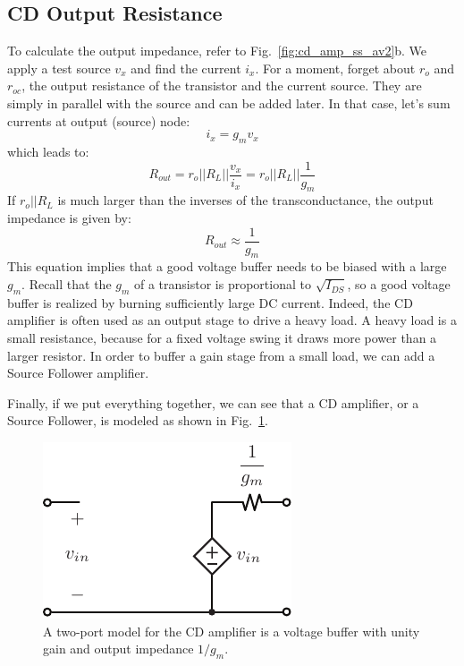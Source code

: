 \subsection{CD Output Resistance}
To calculate the output impedance, refer to Fig.~\ref{fig:cd_amp_ss_av2}b.  We apply a test source $v_x$ and find the current $i_x$.  For a moment, forget about $r_o$ and $r_{oc}$, the output resistance of the transistor and the current source.  They are simply in parallel with the source and can be added later.  In that case, let's sum currents at output (source) node:
\begin{equation}{i_x} = {g_m}{v_x}\end{equation}
which leads to:
\begin{equation}
	{R_{out}} = {r_o}||{R_L}||\frac{{{v_x}}}{{{i_x}}} = {r_o}||{R_L}||\frac{1}{g_m}
\end{equation}
If $r_o || R_L$ is much larger than the inverses of the transconductance, the output impedance is given by:
\begin{equation}
	{R_{out}} \approx \frac{1}{{{g_m}}}
\end{equation}
This equation implies that a good voltage buffer needs to be biased with a large $g_m$.  Recall that the $g_m$ of a transistor is proportional to $\sqrt{I_{DS}}$, so a good voltage buffer is realized by burning sufficiently large DC current.  Indeed, the CD amplifier is often used as an output stage to drive a heavy load.  A heavy load is a small resistance, because for a fixed voltage swing it draws more power than a larger resistor.  In order to buffer a gain stage from a small load, we can add a Source Follower amplifier.  

Finally, if we put everything together, we can see that a CD amplifier, or a Source Follower, is modeled as shown in Fig.~\ref{fig:cd_amp_model}.  
\begin{figure}[tb]
\begin{center}
\includegraphics[scale=1]{cd_amp_model}
\end{center}
\caption{A two-port model for the CD amplifier is a voltage buffer with unity gain and output impedance $1/g_m$.}
\label{fig:cd_amp_model}
\end{figure}
